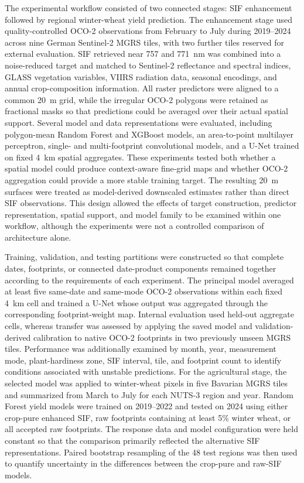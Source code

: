 The experimental workflow consisted of two connected stages: SIF enhancement followed by regional winter-wheat yield prediction. The enhancement stage used quality-controlled OCO-2 observations from February to July during 2019--2024 across nine German Sentinel-2 MGRS tiles, with two further tiles reserved for external evaluation. SIF retrieved near 757 and 771~nm was combined into a noise-reduced target and matched to Sentinel-2 reflectance and spectral indices, GLASS vegetation variables, VIIRS radiation data, seasonal encodings, and annual crop-composition information. All raster predictors were aligned to a common 20~m grid, while the irregular OCO-2 polygons were retained as fractional masks so that predictions could be averaged over their actual spatial support. Several model and data representations were evaluated, including polygon-mean Random Forest and XGBoost models, an area-to-point multilayer perceptron, single- and multi-footprint convolutional models, and a U-Net trained on fixed 4~km spatial aggregates. These experiments tested both whether a spatial model could produce context-aware fine-grid maps and whether OCO-2 aggregation could provide a more stable training target. The resulting 20~m surfaces were treated as model-derived downscaled estimates rather than direct SIF observations. This design allowed the effects of target construction, predictor representation, spatial support, and model family to be examined within one workflow, although the experiments were not a controlled comparison of architecture alone.

Training, validation, and testing partitions were constructed so that complete dates, footprints, or connected date-product components remained together according to the requirements of each experiment. The principal model averaged at least five same-date and same-mode OCO-2 observations within each fixed 4~km cell and trained a U-Net whose output was aggregated through the corresponding footprint-weight map. Internal evaluation used held-out aggregate cells, whereas transfer was assessed by applying the saved model and validation-derived calibration to native OCO-2 footprints in two previously unseen MGRS tiles. Performance was additionally examined by month, year, measurement mode, plant-hardiness zone, SIF interval, tile, and footprint count to identify conditions associated with unstable predictions. For the agricultural stage, the selected model was applied to winter-wheat pixels in five Bavarian MGRS tiles and summarized from March to July for each NUTS-3 region and year. Random Forest yield models were trained on 2019--2022 and tested on 2024 using either crop-pure enhanced SIF, raw footprints containing at least 5\% winter wheat, or all accepted raw footprints. The response data and model configuration were held constant so that the comparison primarily reflected the alternative SIF representations. Paired bootstrap resampling of the 48 test regions was then used to quantify uncertainty in the differences between the crop-pure and raw-SIF models.

